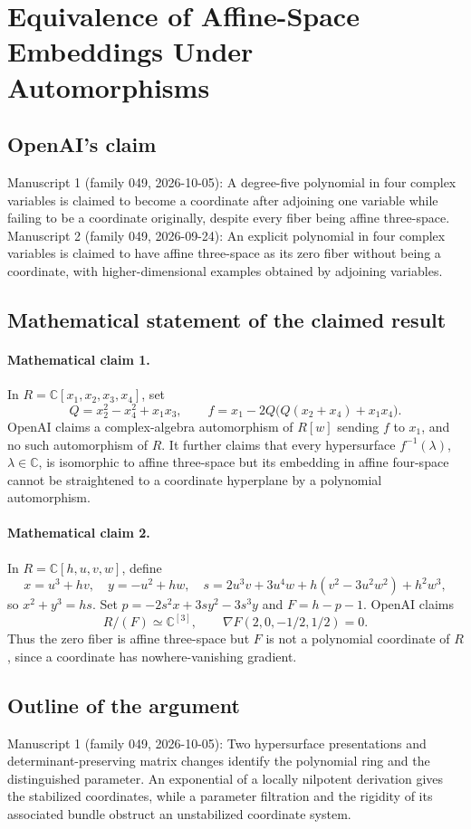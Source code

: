 \documentclass[11pt]{article}
\begin{document}
\section*{Equivalence of Affine-Space Embeddings Under Automorphisms}

\subsection{OpenAI's claim}
Manuscript 1 (family 049, 2026-10-05): A degree-five polynomial in four complex variables is claimed to become a coordinate after adjoining one variable while failing to be a coordinate originally, despite every fiber being affine three-space. Manuscript 2 (family 049, 2026-09-24): An explicit polynomial in four complex variables is claimed to have affine three-space as its zero fiber without being a coordinate, with higher-dimensional examples obtained by adjoining variables.

\subsection{Mathematical statement of the claimed result}
\paragraph{Mathematical claim 1.} In $R=\mathbb C[x_1,x_2,x_3,x_4]$, set
\[
Q=x_2^2-x_4^2+x_1x_3,\qquad f=x_1-2Q\bigl(Q(x_2+x_4)+x_1x_4\bigr).
\]
OpenAI claims a complex-algebra automorphism of $R[w]$ sending $f$ to $x_1$, and no such automorphism of $R$. It further claims that every hypersurface $f^{-1}(\lambda)$, $\lambda\in\mathbb C$, is isomorphic to affine three-space but its embedding in affine four-space cannot be straightened to a coordinate hyperplane by a polynomial automorphism.

\paragraph{Mathematical claim 2.} In $R=\mathbb C[h,u,v,w]$, define
\[
x=u^3+hv,\quad y=-u^2+hw,\quad s=2u^3v+3u^4w+h(v^2-3u^2w^2)+h^2w^3,
\]
so $x^2+y^3=hs$. Set $p=-2s^2x+3sy^2-3s^3y$ and $F=h-p-1$. OpenAI claims
\[
R/(F)\simeq\mathbb C^{[3]},\qquad\nabla F(2,0,-1/2,1/2)=0.
\]
Thus the zero fiber is affine three-space but $F$ is not a polynomial coordinate of $R$, since a coordinate has nowhere-vanishing gradient.

\subsection{Outline of the argument}
Manuscript 1 (family 049, 2026-10-05): Two hypersurface presentations and determinant-preserving matrix changes identify the polynomial ring and the distinguished parameter. An exponential of a locally nilpotent derivation gives the stabilized coordinates, while a parameter filtration and the rigidity of its associated bundle obstruct an unstabilized coordinate system.
\end{document}
